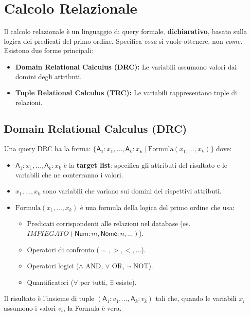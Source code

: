 \documentclass{article}
\newcommand{\Rel}[1]{\textit{#1}} %
\newcommand{\Attr}[1]{\textsf{#1}} %
\newcommand{\mylandop}{\wedge}
\newcommand{\myvel}{\vee}
\newcommand{\mynegop}{\neg}
\newcommand{\myforallop}{\forall}
\newcommand{\myexistsop}{\exists}
\begin{document}
	\section{Calcolo Relazionale}
	Il calcolo relazionale è un linguaggio di query formale, \textbf{dichiarativo}, basato sulla logica dei predicati del primo ordine. Specifica \textit{cosa} si vuole ottenere, non \textit{come}.
	Esistono due forme principali:
	\begin{itemize}
		\item \textbf{Domain Relational Calculus (DRC):} Le variabili assumono valori dai domini degli attributi.
		\item \textbf{Tuple Relational Calculus (TRC):} Le variabili rappresentano tuple di relazioni.
	\end{itemize}
	
	\subsection{Domain Relational Calculus (DRC)}
	Una query DRC ha la forma:
	$\{ \Attr{A}_1:x_1, \dots, \Attr{A}_k:x_k \mid \text{Formula}(x_1, \dots, x_k) \}$
	dove:
	\begin{itemize}
		\item $\Attr{A}_1:x_1, \dots, \Attr{A}_k:x_k$ è la \textbf{target list}: specifica gli attributi del risultato e le variabili che ne conterranno i valori.
		\item $x_1, \dots, x_k$ sono variabili che variano sui domini dei rispettivi attributi.
		\item $\text{Formula}(x_1, \dots, x_k)$ è una formula della logica del primo ordine che usa:
		\begin{itemize}
			\item Predicati corrispondenti alle relazioni nel database (es. $\Rel{IMPIEGATO}(\Attr{Num}:m, \Attr{Nome}:n, \dots)$).
			\item Operatori di confronto ($=, >, <, \dots$).
			\item Operatori logici ($\mylandop$ AND, $\myvel$ OR, $\mynegop$ NOT).
			\item Quantificatori ($\myforallop$ per tutti, $\myexistsop$ esiste).
		\end{itemize}
	\end{itemize}
	Il risultato è l'insieme di tuple $(\Attr{A}_1:v_1, \dots, \Attr{A}_k:v_k)$ tali che, quando le variabili $x_i$ assumono i valori $v_i$, la Formula è vera.
	
\end{document}
